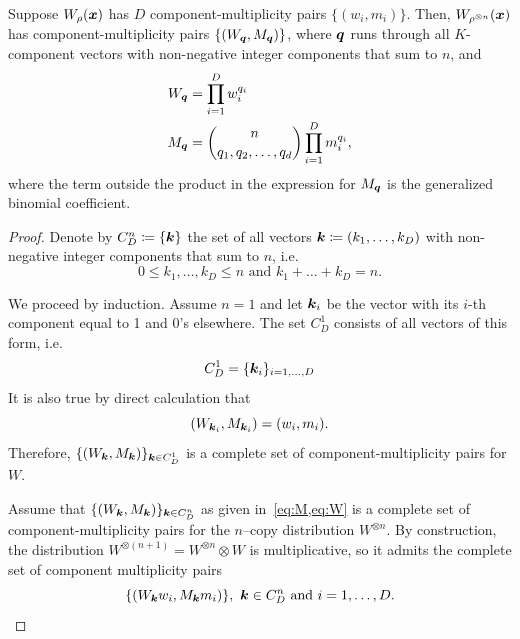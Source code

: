 \documentclass[pra,
aps,
twocolumn,
superscriptaddress,
groupedaddress,
nofootinbib,
reprint
]{revtex4-1}
\begin{document}
\begin{lemma}\label{lem:ncopycomponents}
	Suppose $W_\rho(\boldsymbol{x})$ has $D$ component-multiplicity pairs $\{(w_i, m_i)\}$. Then, $W_{\rho^{\otimes n}} (\boldsymbol{x})$ has component-multiplicity pairs $\{(W_{\boldsymbol{q}}, M_{\boldsymbol{q}})\}$, where $\boldsymbol{q}$ runs through all $K$-component vectors with non-negative integer components that sum to $n$, and
\begin{align}
W_{\boldsymbol{q}} &= \prod_{i=1}^D w_i^{q_i} \label{eq:W}\\
M_{\boldsymbol{q}} &= \binom{n}{q_1,q_2, \dots, q_d} \prod_{i=1}^D m_i^{q_i}, \label{eq:M}
\end{align}
where the term outside the product in the expression for $M_{\boldsymbol{q}}$ is the generalized binomial coefficient.
\end{lemma}
\begin{proof}
	Denote by $C_D^n \coloneqq \{\bm{k}\}$ the set of all vectors $\bm{k} \coloneqq (k_1, \dots, k_D)$ with non-negative integer components that sum to $n$, i.e.
	\begin{equation*}
	0 \leq k_1, \dots, k_D \leq n \text{ and } k_1 + \dots + k_D = n.
	\end{equation*}
	
	We proceed by induction.	
	Assume $n = 1$ and let $\bm{k}_i$ be the vector with its $i$-th component equal to 1 and 0's elsewhere.
	The set $C_D^1$ consists of all vectors of this form, i.e. 
\begin{equation*}
	C_D^1 = \{ \bm{k}_i \}_{i=1,\dots,D}
\end{equation*}
	It is also true by direct calculation that
\begin{equation*}
	\left( W_{\bm{k}_i}, M_{\bm{k}_i} \right) = (w_i, m_i).
\end{equation*}
Therefore, $\{ (W_{\bm{k}}, M_{\bm{k}}) \}_{\bm{k} \in C_D^1}$ is a complete set of component-multiplicity pairs for $W$.

	Assume that $\{(W_{\bm{k}}, M_{\bm{k}})\}_{\bm{k} \in C_D^n}$ as given in~\cref{eq:M,eq:W} is a complete set of component-multiplicity pairs for the $n$--copy distribution $W^{\otimes n}$.
	By construction, the distribution $W^{\otimes (n+1)} = W^{\otimes n} \otimes W$ is multiplicative, so it admits the complete set of component multiplicity pairs
\begin{equation}
	\{(W_{\bm{k}} w_i, M_{\bm{k}} m_i)\},\ \bm{k} \in C_D^n \text{ and } i=1,\dots,D.
\end{equation}
	

\end{proof}
\end{document}
